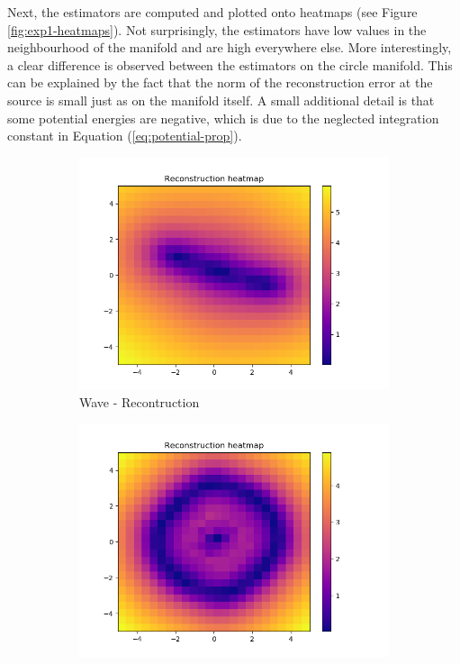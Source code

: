 Next, the estimators are computed and plotted onto heatmaps (see Figure \ref{fig:exp1-heatmaps}). Not surprisingly, the estimators have low values in the neighbourhood of the manifold and are high everywhere else. More interestingly, a clear difference is observed between the estimators on the circle manifold. This can be explained by the fact that the norm of the reconstruction error at the source is small just as on the manifold itself. A small additional detail is that some potential energies are negative, which is due to the neglected integration constant in Equation (\ref{eq:potential-prop}).
\begin{figure}[!h]
\centering
\begin{subfigure}{.5\textwidth}
  \centering
  \includegraphics[width=.95\linewidth]{figures/wave-quantifier-reconstruction}
  \caption{Wave - Recontruction}
\end{subfigure}%
\begin{subfigure}{.5\textwidth}
  \centering
  \includegraphics[width=.95\linewidth]{figures/circle-quantifier-reconstruction}

\end{subfigure}
\end{figure}
